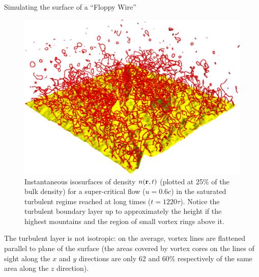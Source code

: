 \begin{chapter}{\label{cha:afm}Simulating the surface of a ``Floppy Wire''}
\begin{figure}
\centering
{}%
\includegraphics[width=0.5\linewidth]{./afm/fig2-2b}%
\caption{Instantaneous isosurfaces of density $n({\bf r},t)$ 
(plotted at 25\%  of the bulk density) for a super-critical flow ($u=0.6 c$) in the saturated 
turbulent regime reached at long times ($t=1220 \tau$).  Notice the turbulent boundary layer up to
approximately the height if the highest mountains and the region
of small vortex rings above it.}
\label{fig2}
\end{figure} 


The turbulent
layer is not isotropic: on the average, vortex lines are 
flattened parallel to plane of the surface
(the areas covered by vortex cores on
the lines of sight along the $x$ and $y$ directions are only 62 and 60$\%$ 
respectively of the same area along the $z$ direction).  



\end{chapter}
